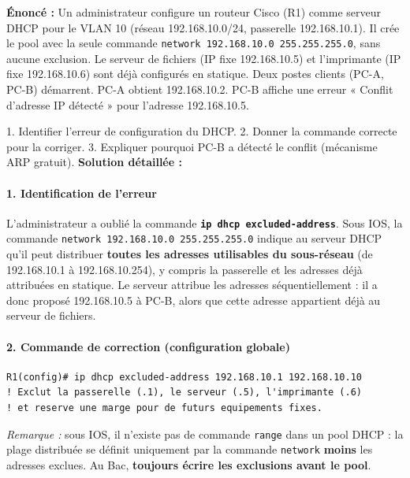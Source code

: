 \documentclass[11pt]{article}
\begin{document}
\begin{exoresolu}
\textbf{Énoncé :} Un administrateur configure un routeur Cisco (R1) comme serveur DHCP pour le VLAN 10 (réseau 192.168.10.0/24, passerelle 192.168.10.1). Il crée le pool avec la seule commande \texttt{network 192.168.10.0 255.255.255.0}, sans aucune exclusion. Le serveur de fichiers (IP fixe 192.168.10.5) et l'imprimante (IP fixe 192.168.10.6) sont déjà configurés en statique. Deux postes clients (PC-A, PC-B) démarrent. PC-A obtient 192.168.10.2. PC-B affiche une erreur « Conflit d'adresse IP détecté » pour l'adresse 192.168.10.5.\par
1. Identifier l'erreur de configuration du DHCP. 2. Donner la commande correcte pour la corriger. 3. Expliquer pourquoi PC-B a détecté le conflit (mécanisme ARP gratuit).
\tcblower
\textbf{Solution détaillée :}

\paragraph{1. Identification de l'erreur}
L'administrateur a oublié la commande \textbf{\texttt{ip dhcp excluded-address}}. Sous IOS, la commande \texttt{network 192.168.10.0 255.255.255.0} indique au serveur DHCP qu'il peut distribuer \textbf{toutes les adresses utilisables du sous-réseau} (de 192.168.10.1 à 192.168.10.254), y compris la passerelle et les adresses déjà attribuées en statique. Le serveur attribue les adresses séquentiellement : il a donc proposé 192.168.10.5 à PC-B, alors que cette adresse appartient déjà au serveur de fichiers.

\paragraph{2. Commande de correction (configuration globale)}
\begin{lstlisting}
R1(config)# ip dhcp excluded-address 192.168.10.1 192.168.10.10
! Exclut la passerelle (.1), le serveur (.5), l'imprimante (.6)
! et reserve une marge pour de futurs equipements fixes.
\end{lstlisting}
\emph{Remarque :} sous IOS, il n'existe pas de commande \texttt{range} dans un pool DHCP : la plage distribuée se définit uniquement par la commande \texttt{network} \textbf{moins} les adresses exclues. Au Bac, \textbf{toujours écrire les exclusions avant le pool}.


\end{exoresolu}
\end{document}
